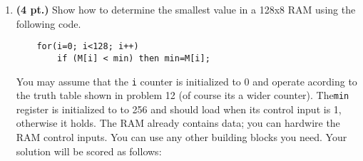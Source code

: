 \documentclass{article}
\begin{document}
\begin{enumerate}
\item {\bf (4 pt.)} Show how to determine the smallest value in a 
128x8 RAM using the following code.  
\begin{verbatim}
    for(i=0; i<128; i++)
        if (M[i] < min) then min=M[i];
\end{verbatim}
You may assume that the \verb+i+ counter is initialized to 0 and
operate acording to the truth table shown in problem 12 (of course its 
a wider counter).  The\verb+min+ register is initialized to to 256 and
should load when its control input is 1, otherwise it holds.  The RAM
already contains data; you can hardwire the RAM control inputs.  You
can use any other building blocks you need.  Your solution will be scored 
as follows:

\end{enumerate}
\end{document}
